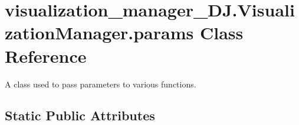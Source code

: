 \hypertarget{classvisualization__manager___d_j_1_1_visualization_manager_1_1params}{}\section{visualization\+\_\+manager\+\_\+\+D\+J.\+Visualization\+Manager.\+params Class Reference}
\label{classvisualization__manager___d_j_1_1_visualization_manager_1_1params}


A class used to pass parameters to various functions.  


\subsection*{Static Public Attributes}

